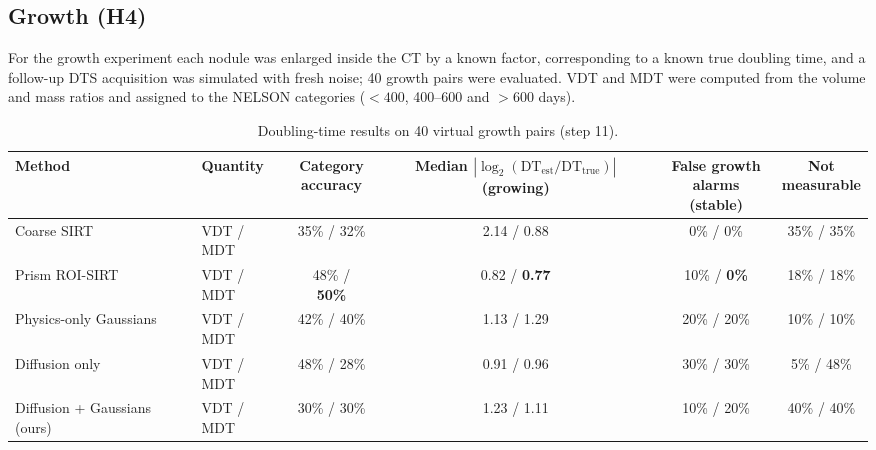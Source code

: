 
\subsection{Growth (H4)}

For the growth experiment each nodule was enlarged inside the CT by a known factor, corresponding to a known true doubling time, and a follow-up DTS acquisition was simulated with fresh noise; 40 growth pairs were evaluated. VDT and MDT were computed from the volume and mass ratios and assigned to the NELSON categories ($<400$, 400--600 and $>600$ days).

\begin{table}[!htbp]
\centering\small
\caption{Doubling-time results on 40 virtual growth pairs (step 11).}
\label{tab:growth}
\begin{adjustbox}{max width=\linewidth}
\begin{tabular}{ll cccc}
\toprule
Method & Quantity & \makecell{Category\\accuracy} & \makecell{Median $|\log_2(\mathrm{DT}_{\mathrm{est}}/\mathrm{DT}_{\mathrm{true}})|$\\(growing)} & \makecell{False growth\\alarms (stable)} & \makecell{Not\\measurable} \\
\midrule
Coarse SIRT & VDT / MDT & 35\% / 32\% & 2.14 / 0.88 & 0\% / 0\% & 35\% / 35\% \\
Prism ROI-SIRT & VDT / MDT & 48\% / \textbf{50\%} & 0.82 / \textbf{0.77} & 10\% / \textbf{0\%} & 18\% / 18\% \\
Physics-only Gaussians & VDT / MDT & 42\% / 40\% & 1.13 / 1.29 & 20\% / 20\% & 10\% / 10\% \\
Diffusion only & VDT / MDT & 48\% / 28\% & 0.91 / 0.96 & 30\% / 30\% & 5\% / 48\% \\
Diffusion + Gaussians (ours) & VDT / MDT & 30\% / 30\% & 1.23 / 1.11 & 10\% / 20\% & 40\% / 40\% \\
\bottomrule
\end{tabular}
\end{adjustbox}
\end{table}

